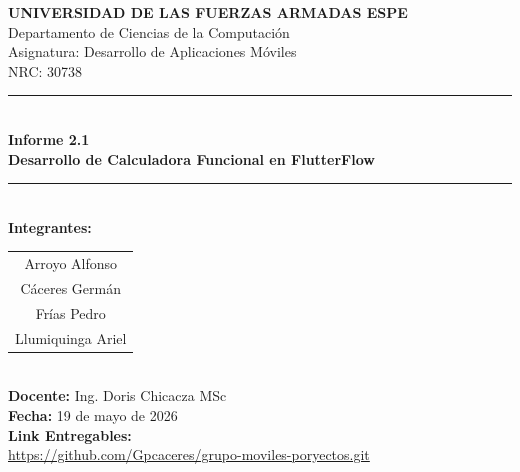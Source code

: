 \documentclass[12pt,a4paper]{article}
\begin{document}

\thispagestyle{portada}
\singlespacing
\setlength{\parskip}{0pt}
\vspace*{1.2cm}
\begin{center}
  {\Large\bfseries\color{espeblue}
    UNIVERSIDAD DE LAS FUERZAS ARMADAS ESPE\\[0.3cm]}
  {\large\color{espeblue}
    Departamento de Ciencias de la Computación\\[0.2cm]
    Asignatura: Desarrollo de Aplicaciones Móviles\\[0.2cm]
    NRC: 30738\\[0.6cm]}
  \textcolor{espeblue}{\rule{\linewidth}{1.5pt}}\\[0.4cm]
  {\LARGE\bfseries\color{espeblue}
    Informe 2.1\\[0.25cm]
    Desarrollo de Calculadora Funcional en FlutterFlow\\[0.35cm]}
  \textcolor{espeblue}{\rule{\linewidth}{1.5pt}}\\[1.0cm]
  {\large\bfseries Integrantes:}\\[0.4cm]
  \begin{tabular}{c}
    Arroyo Alfonso\\[0.15cm]
    Cáceres Germán\\[0.15cm]
    Frías Pedro\\[0.15cm]
    Llumiquinga Ariel\\
  \end{tabular}\\[1.5cm]
  {\large\textbf{Docente:} Ing. Doris Chicacza MSc}\\[0.35cm]
  {\large\textbf{Fecha:} 19 de mayo de 2026}\\[0.35cm]
  
  {\large\textbf{Link Entregables:}}\\[0.35cm]
  {\large\url{https://github.com/Gpcaceres/grupo-moviles-poryectos.git}}\\[0.35cm]
\end{center}


\newpage
{}

\tableofcontents

\listoffigures
\end{document}
